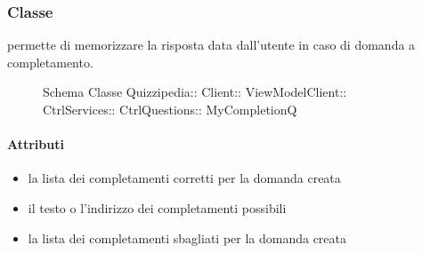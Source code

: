\subsubsection{Classe }
permette di memorizzare la risposta data dall'utente in caso di domanda a completamento.
\begin{figure}[H]
\centering
\noindent{}
\caption[Schema Classe MyCompletionQ]{Schema Classe Quizzipedia:: Client:: ViewModelClient:: CtrlServices:: CtrlQuestions:: MyCompletionQ}
\end{figure}
\paragraph{Attributi}
\begin{itemize}
\item {}
\newline
la lista dei completamenti corretti per la domanda creata
\item {}
\newline
il testo o l'indirizzo dei completamenti possibili
\item {}
\newline
la lista dei completamenti sbagliati per la domanda creata
\end{itemize}
